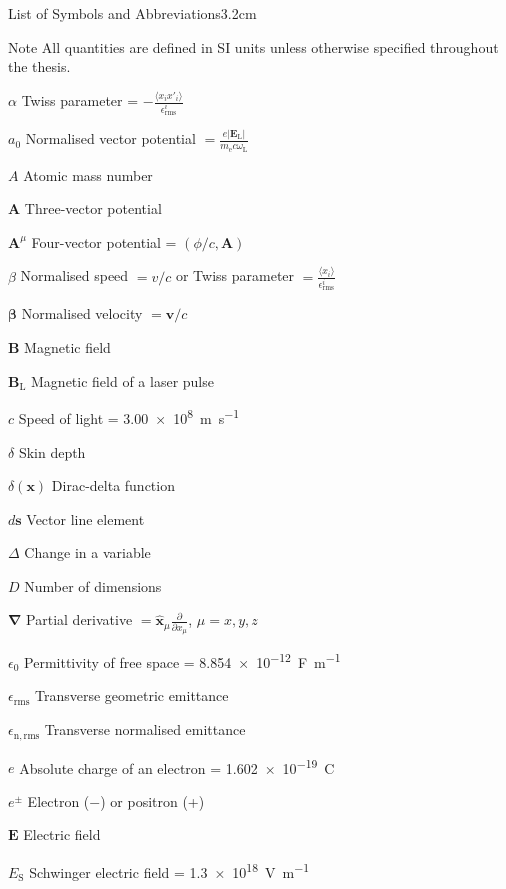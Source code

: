 \begin{mclistof}{List of Symbols and Abbreviations}{3.2cm}
\item[Note] All quantities are defined in SI units unless otherwise specified throughout the thesis.
\item[$\alpha$] Twiss parameter = $-\frac{\langle x_i x'_i \rangle}{\epsilon^i_\mathrm{rms}}$
\item[$a_0$] Normalised vector potential $= \frac{e|\mathbf{E}_\mathrm{L}|}{m_\mathrm{e}c\omega_\mathrm{L}}$
\item[$A$] Atomic mass number
\item[$\mathbf{A}$] Three-vector potential
\item[$\mathbf{A}^\mu$] Four-vector potential = $(\phi/c, \mathbf{A})$
\item[$\beta$] Normalised speed $= v/c$ or Twiss parameter $= \frac{\langle x_i \rangle}{\epsilon^i_\mathrm{rms}}$
\item[$\mathbf{\beta}$] Normalised velocity $= \mathbf{v}/c$
\item[$\mathbf{B}$] Magnetic field
\item[$\mathbf{B}_\mathrm{L}$] Magnetic field of a laser pulse
\item[$c$] Speed of light = \qty{3.00e8}{m.s^{-1}}
\item[$\delta$] Skin depth
\item[$\delta(\mathbf{x})$] Dirac-delta function
\item[$d\mathbf{s}$] Vector line element
\item[$\Delta$] Change in a variable
\item[$D$] Number of dimensions
\item[$\mathbf{\nabla}$] Partial derivative $= \hat{\mathbf{x}}_\mu \frac{\partial }{\partial x_\mu}$, $\mu = x,y,z$
\item[$\epsilon_0$] Permittivity of free space = \qty{8.854e-12}{F.m^{-1}}
\item[$\epsilon_\mathrm{rms}$] Transverse geometric emittance
\item[$\epsilon_\mathrm{n,rms}$] Transverse normalised emittance
\item[$e$] Absolute charge of an electron = \qty{1.602e-19}{C}
\item[$e^\pm$] Electron ($-$) or positron (+)
\item[$\mathbf{E}$] Electric field
\item[$E_\mathrm{S}$] Schwinger electric field = \qty{1.3e18}{V.m^{-1}}

\end{mclistof}
